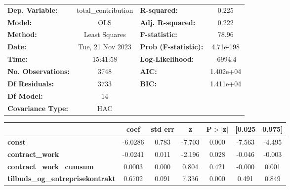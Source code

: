 \begin{center}
\begin{tabular}{lclc}
\toprule
\textbf{Dep. Variable:}                     & total\_contribution & \textbf{  R-squared:         } &     0.225   \\
\textbf{Model:}                             &         OLS         & \textbf{  Adj. R-squared:    } &     0.222   \\
\textbf{Method:}                            &    Least Squares    & \textbf{  F-statistic:       } &     78.96   \\
\textbf{Date:}                              &   Tue, 21 Nov 2023  & \textbf{  Prob (F-statistic):} & 4.71e-198   \\
\textbf{Time:}                              &       15:41:58      & \textbf{  Log-Likelihood:    } &   -6994.4   \\
\textbf{No. Observations:}                  &          3748       & \textbf{  AIC:               } & 1.402e+04   \\
\textbf{Df Residuals:}                      &          3733       & \textbf{  BIC:               } & 1.411e+04   \\
\textbf{Df Model:}                          &            14       & \textbf{                     } &             \\
\textbf{Covariance Type:}                   &         HAC         & \textbf{                     } &             \\
\bottomrule
\end{tabular}
\begin{tabular}{lcccccc}
                                            & \textbf{coef} & \textbf{std err} & \textbf{z} & \textbf{P$> |$z$|$} & \textbf{[0.025} & \textbf{0.975]}  \\
\midrule
\textbf{const}                              &      -6.0286  &        0.783     &    -7.703  &         0.000        &       -7.563    &       -4.495     \\
\textbf{contract\_work}                     &      -0.0241  &        0.011     &    -2.196  &         0.028        &       -0.046    &       -0.003     \\
\textbf{contract\_work\_cumsum}             &       0.0003  &        0.000     &     0.804  &         0.421        &       -0.000    &        0.001     \\
\textbf{tilbuds\_og\_entreprisekontrakt}    &       0.6702  &        0.091     &     7.336  &         0.000        &        0.491    &        0.849     \\

\end{tabular}
\end{center}
